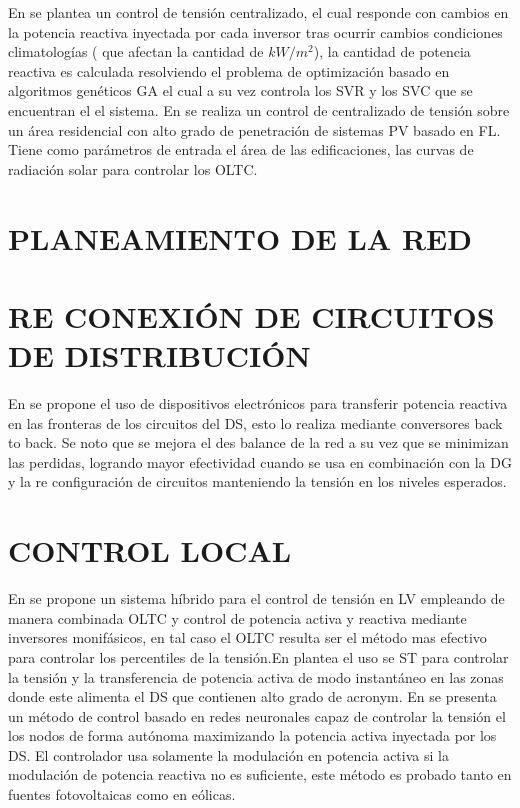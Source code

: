 \documentclass[12pt, letterpaper]{report}
\begin{document}
En \cite{Oshiro2011a} se plantea un control de tensión centralizado,  el cual responde con  cambios en la potencia reactiva inyectada por cada inversor tras  ocurrir cambios condiciones climatologías ( que afectan la cantidad de $kW/m^{2}$), la cantidad de potencia reactiva es calculada resolviendo el problema de optimización  basado en algoritmos genéticos \ac{GA} el cual a su vez controla los \ac{SVR}  y los \ac{SVC} que se encuentran el el sistema. 
En \cite{Shalwala2011a} se realiza un control de centralizado  de tensión sobre un área residencial con alto grado de penetración de sistemas \ac{PV} basado en \ac{FL}. Tiene como parámetros  de entrada el área de las edificaciones, las curvas de radiación solar para controlar los \ac{OLTC}.  
\section{PLANEAMIENTO DE LA RED}

\section{RE CONEXIÓN DE CIRCUITOS DE DISTRIBUCIÓN}
\label{cap:clasificacion}
En \cite{Cao2016} se propone el uso de dispositivos electrónicos para transferir potencia reactiva en las fronteras de los circuitos del \ac{DS}, esto lo realiza mediante conversores back to back. Se noto que se mejora el des balance de la red a su vez que se minimizan las perdidas, logrando mayor efectividad cuando se usa en combinación con la DG y la re configuración de circuitos manteniendo la tensión en los niveles esperados.\\

\section{CONTROL LOCAL}
En \cite{Efkarpidis2016} se propone un sistema híbrido para el control de tensión en LV empleando de manera combinada OLTC y control de potencia activa y reactiva mediante inversores monifásicos, en tal caso el OLTC resulta ser el método mas efectivo para controlar los percentiles de la tensión.En \cite{Colak2015} plantea el uso se \ac{ST} para controlar la tensión y la transferencia de potencia activa de modo instantáneo en las zonas donde este alimenta el \ac{DS}  que contienen alto grado de \ac{acronym}. En \cite{Calderaro2014} se presenta un método de control basado en redes neuronales  capaz de controlar la tensión el los nodos de forma autónoma maximizando la potencia activa inyectada por los \ac{DS}. El controlador usa solamente la modulación en potencia activa si la modulación  de potencia reactiva no es suficiente, este método es probado tanto en fuentes fotovoltaicas  como en eólicas.\\  
\end{document}
